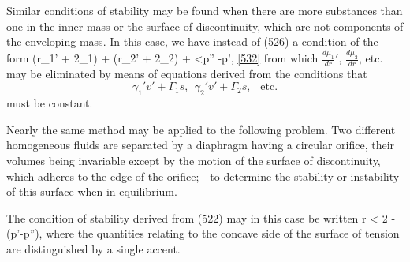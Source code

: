 \documentclass[12pt]{memoir}
\begin{document}
{Similar conditions of stability may be found when there are more substances than one in the inner mass or the surface of discontinuity, which are not components of the enveloping mass. In this case, we have instead of (526) a condition of the form
\eqs (r\gamma_1' + 2\Gamma_1)  + (r\gamma_2' + 2\Gamma_2)  +  <p'' -p',  \ref{532} \eqe
from which $\frac{d\mu_1}{dr}'$, $\frac{d\mu_2}{dr}$, etc. may be eliminated by means of equations
derived from the conditions that
$$ \gamma_1' v' + \Gamma_1 s, \ \ \gamma_2' v' + \Gamma_2 s, \ \ \text{ etc.} $$
must be constant.

Nearly the same method may be applied to the following problem. Two different homogeneous fluids are separated by a diaphragm having a circular orifice, their volumes being invariable except by the motion of the surface of discontinuity, which adheres to the edge of the orifice;---to determine the stability or instability of this surface when in equilibrium.

The condition of stability derived from (522) may in this case be
written
\eqs r < 2 - (p'-p''), \label{535} \eqe
where the quantities relating to the concave side of the surface of tension are distinguished by a single accent.

}
\end{document}
